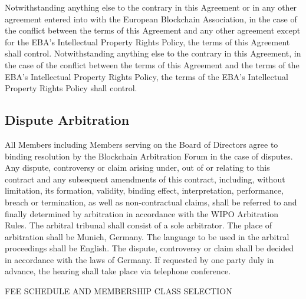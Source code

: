 \documentclass{article}
\begin{document}
Notwithstanding anything else to the contrary in this Agreement or in any other agreement entered into with the European Blockchain Association, in the case of the conflict between the terms of this Agreement and any other agreement except for the EBA’s Intellectual Property Rights Policy, the terms of this Agreement shall control. 
Notwithstanding anything else to the contrary in this Agreement, in the case of the conflict between the terms of this Agreement and the terms of the EBA’s Intellectual Property Rights Policy, the terms of the EBA’s Intellectual Property Rights Policy shall control.

\subsection{Dispute Arbitration}

All Members including Members serving on the Board of Directors agree to binding resolution by the Blockchain Arbitration Forum in the case of disputes.
 Any dispute, controversy or claim arising under, out of or relating to this contract and any subsequent amendments of this contract, including, without limitation, its formation, validity, binding effect, interpretation, performance, breach or termination, as well as non-contractual claims, shall be referred to and finally determined by arbitration in accordance with the WIPO Arbitration Rules. 
 The arbitral tribunal shall consist of a sole arbitrator. 
 The place of arbitration shall be Munich, Germany.
  The language to be used in the arbitral proceedings shall be English. 
  The dispute, controversy or claim shall be decided in accordance with the laws of Germany. 
  If requested by one party duly in advance, the hearing shall take place via telephone conference.

\newpage

{\scshape\LARGE FEE SCHEDULE AND MEMBERSHIP CLASS SELECTION \centering \par}
\end{document}

